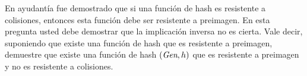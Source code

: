 
En ayudantía fue demostrado que si una función de hash es resistente a
colisiones, entonces esta función debe ser resistente a preimagen. En
esta pregunta usted debe demostrar que la implicación inversa no es
cierta. Vale decir, suponiendo que existe una función de hash que es
resistente a preimagen, demuestre que existe una función de hash
$(\textit{Gen}, h)$ que es resistente a preimagen y no es resistente
a colisiones.
